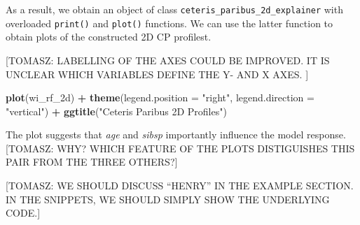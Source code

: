 \documentclass[12pt,]{krantz}
\newenvironment{Shaded}{\begin{snugshade}}{\end{snugshade}}
\newcommand{\DataTypeTok}[1]{\textcolor[rgb]{0.13,0.29,0.53}{#1}}
\newcommand{\KeywordTok}[1]{\textcolor[rgb]{0.13,0.29,0.53}{\textbf{#1}}}
\newcommand{\NormalTok}[1]{#1}
\newcommand{\OperatorTok}[1]{\textcolor[rgb]{0.81,0.36,0.00}{\textbf{#1}}}
\newcommand{\StringTok}[1]{\textcolor[rgb]{0.31,0.60,0.02}{#1}}
\begin{document}
As a result, we obtain an object of class \texttt{ceteris\_paribus\_2d\_explainer} with overloaded \texttt{print()} and \texttt{plot()} functions. We can use the latter function to obtain plots of the constructed 2D CP profilest.

{[}TOMASZ: LABELLING OF THE AXES COULD BE IMPROVED. IT IS UNCLEAR WHICH VARIABLES DEFINE THE Y- AND X AXES. {]}

\begin{Shaded}
\begin{Highlighting}[]
\KeywordTok{plot}\NormalTok{(wi_rf_2d) }\OperatorTok{+}\StringTok{ }
\StringTok{  }\KeywordTok{theme}\NormalTok{(}\DataTypeTok{legend.position =} \StringTok{"right"}\NormalTok{, }\DataTypeTok{legend.direction =} \StringTok{"vertical"}\NormalTok{) }\OperatorTok{+}\StringTok{ }\KeywordTok{ggtitle}\NormalTok{(}\StringTok{"Ceteris Paribus 2D Profiles"}\NormalTok{)}
\end{Highlighting}
\end{Shaded}

The plot suggests that \emph{age} and \emph{sibsp} importantly influence the model response. {[}TOMASZ: WHY? WHICH FEATURE OF THE PLOTS DISTIGUISHES THIS PAIR FROM THE THREE OTHERS?{]}

{[}TOMASZ: WE SHOULD DISCUSS ``HENRY'' IN THE EXAMPLE SECTION. IN THE SNIPPETS, WE SHOULD SIMPLY SHOW THE UNDERLYING CODE.{]}


\end{document}
